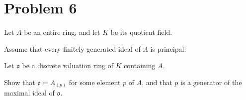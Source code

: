 \documentclass{article}
\begin{document}
\section*{Problem 6}\paragraph{}
Let $A$ be an entire ring, and let $K$ be its quotient field.

Assume that every finitely generated ideal of $A$ is principal.

Let $\mathfrak{o}$ be a discrete valuation ring of $K$ containing $A$.

Show that $\mathfrak{o}=A_{(p)}$ for some element $p$ of $A$, and that $p$ is a generator of the maximal ideal of $\mathfrak{o}$.
\end{document}
